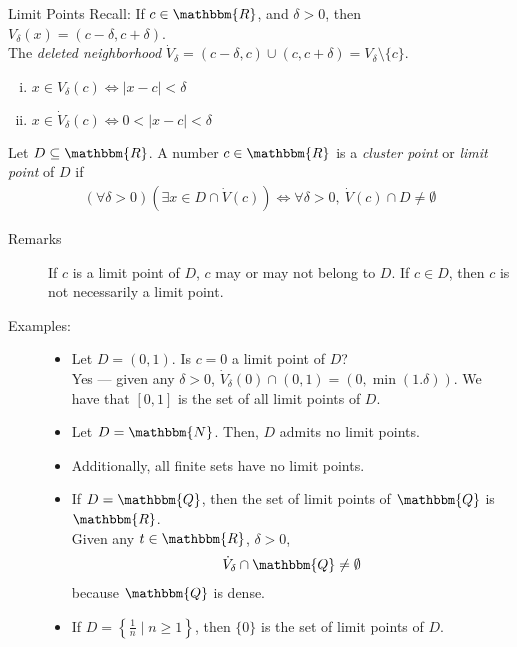 \documentclass[10pt]{extarticle}
\newcommand{\N}{\mathbbm{N}}
\newcommand{\Q}{\mathbbm{Q}}
\newcommand{\R}{\mathbbm{R}}
\begin{document}
  \begin{problem}{Limit Points}
    Recall: If $c\in\R$, and $\delta > 0$, then $V_{\delta}(x) = (c-\delta, c+\delta)$.\\

    The \textit{deleted neighborhood} $\dot{V}_{\delta} = (c-\delta,c) \cup (c,c+\delta) = V_{\delta}\setminus \{c\}$.
    \begin{enumerate}[(i)]
      \item $x\in V_{\delta}(c) \Leftrightarrow |x-c| < \delta$
      \item $x\in \dot{V}_{\delta}(c) \Leftrightarrow 0 < |x-c| < \delta$
    \end{enumerate}
    Let $D \subseteq \R$. A number $c\in\R$ is a \textit{cluster point} or \textit{limit point} of $D$ if 
    \begin{align*}
      (\forall \delta > 0)(\exists x\in D \cap \dot{V}(c)) \Leftrightarrow \forall \delta > 0,~\dot{V}(c)\cap D \neq \emptyset
    \end{align*}
    \begin{description}
      \item[Remarks] If $c$ is a limit point of $D$, $c$ may or may not belong to $D$. If $c\in D$, then $c$ is not necessarily a limit point.
      \item[Examples:]\hfill
        \begin{itemize}
          \item Let $D = (0,1)$. Is $c = 0$ a limit point of $D$?\\

            Yes --- given any $\delta > 0$, $\dot{V}_{\delta}(0) \cap (0,1) = (0,\min(1.\delta))$. We have that $[0,1]$ is the set of all limit points of $D$.
          \item Let $D = \N$. Then, $D$ admits no limit points.
          \item Additionally, all finite sets have no limit points.
          \item If $D = \Q$, then the set of limit points of $\Q$ is $\R$.\\

            Given any $t\in\R$, $\delta > 0$,
            \begin{align*}
              \dot{V}_{\delta} \cap \Q \neq \emptyset
            \end{align*}
            because $\Q$ is dense.
          \item If $D = \left\{\frac{1}{n}\mid n\geq 1\right\}$, then $\{0\}$ is the set of limit points of $D$.
        \end{itemize}
    \end{description}
  \end{problem}
\end{document}
